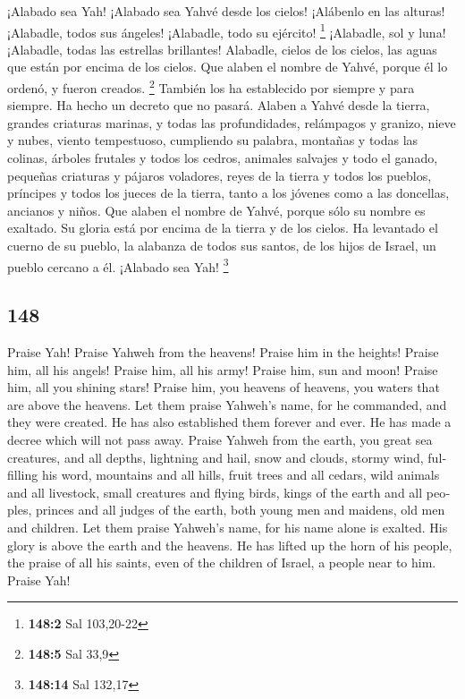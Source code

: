 \begin{paracol}{2}
 ¡Alabado sea Yah! ¡Alabado sea Yahvé desde los cielos!
¡Alábenlo en las alturas!  ¡Alabadle, todos sus ángeles!
¡Alabadle, todo su ejército! \footnote{\textbf{148:2} Sal 103,20-22}
 ¡Alabadle, sol y luna! ¡Alabadle, todas las estrellas
brillantes!  Alabadle, cielos de los cielos, las aguas que
están por encima de los cielos.  Que alaben el nombre de
Yahvé, porque él lo ordenó, y fueron creados. \footnote{\textbf{148:5}
  Sal 33,9}  También los ha establecido por siempre y para
siempre. Ha hecho un decreto que no pasará.  Alaben a
Yahvé desde la tierra, grandes criaturas marinas, y todas las
profundidades,  relámpagos y granizo, nieve y nubes,
viento tempestuoso, cumpliendo su palabra,  montañas y
todas las colinas, árboles frutales y todos los cedros, 
animales salvajes y todo el ganado, pequeñas criaturas y pájaros
voladores,  reyes de la tierra y todos los pueblos,
príncipes y todos los jueces de la tierra,  tanto a los
jóvenes como a las doncellas, ancianos y niños.  Que
alaben el nombre de Yahvé, porque sólo su nombre es exaltado. Su gloria
está por encima de la tierra y de los cielos.  Ha
levantado el cuerno de su pueblo, la alabanza de todos sus santos, de
los hijos de Israel, un pueblo cercano a él. ¡Alabado sea Yah!
\footnote{\textbf{148:14} Sal 132,17}

\switchcolumn
\begin{otherlanguage}{english}

\hypertarget{section-295}{%
\section{148}\label{section-295}}

 Praise Yah! Praise Yahweh from the heavens! Praise him in
the heights!  Praise him, all his angels! Praise him, all
his army!  Praise him, sun and moon! Praise him, all you
shining stars!  Praise him, you heavens of heavens, you
waters that are above the heavens.  Let them praise
Yahweh's name, for he commanded, and they were created. 
He has also established them forever and ever. He has made a decree
which will not pass away.  Praise Yahweh from the earth,
you great sea creatures, and all depths,  lightning and
hail, snow and clouds, stormy wind, fulfilling his word, 
mountains and all hills, fruit trees and all cedars, 
wild animals and all livestock, small creatures and flying birds,
 kings of the earth and all peoples, princes and all
judges of the earth,  both young men and maidens, old men
and children.  Let them praise Yahweh's name, for his
name alone is exalted. His glory is above the earth and the heavens.
 He has lifted up the horn of his people, the praise of
all his saints, even of the children of Israel, a people near to him.
Praise Yah!


\end{otherlanguage}
\end{paracol}
